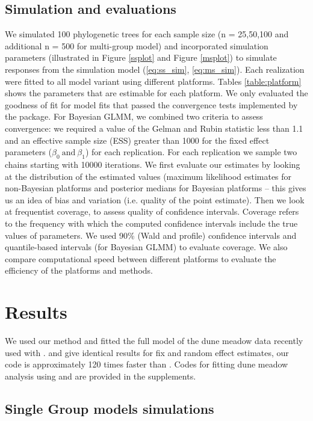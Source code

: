 \documentclass[12pt]{article}
\begin{document}
\subsection*{Simulation and evaluations}
We simulated 100 phylogenetic trees for each sample size (n = 25,50,100 and additional n = 500 for multi-group model) and incorporated simulation parameters (illustrated in Figure \ref{ssplot} and Figure \ref{msplot}) to simulate responses from the simulation model (\ref{eq:ss_sim}, \ref{eq:ms_sim}).
Each realization were fitted to all model variant using different platforms.
Tables \ref{table:platform} shows the parameters that are estimable for each platform. 
We only evaluated the goodness of fit for model fits that passed the convergence tests implemented by the package.
For Bayesian GLMM, we combined two criteria to assess convergence: we required a value of the Gelman and Rubin statistic less than 1.1 and an effective sample size (ESS) greater than 1000 for the fixed effect parameters ($\beta_{0} \ \textrm{and} \ \beta_{1}$) for each replication. 
For each replication we sample two chains starting with 10000 iterations. 
We first evaluate our estimates by looking at the distribution of the estimated values (maximum likelihood estimates for non-Bayesian platforms and posterior medians for Bayesian platforms -- this gives us an idea of bias and variation (i.e. quality of the point estimate).
Then we look at frequentist coverage, to assess quality of confidence intervals.
Coverage refers to the frequency with which the computed confidence intervals include the true values of parameters.
We used 90\% (Wald and profile) confidence intervals and quantile-based intervals (for Bayesian GLMM) to evaluate coverage.
We also compare computational speed between different platforms to evaluate the efficiency of the platforms and methods. 

\section*{Results}

We used our method and fitted the full model of the dune meadow data recently used with  \citep{li2017canfun}. 
 and  give identical results for fix and random effect estimates, our code is approximately 120 times faster than . 
Codes for fitting dune meadow analysis using  and  are provided in the supplements. 

\subsection*{Single Group models simulations}
\end{document}
